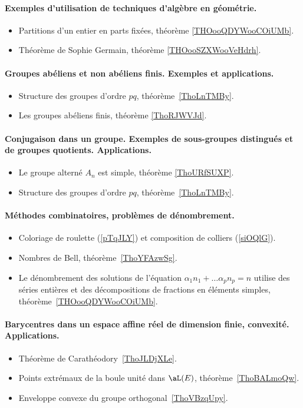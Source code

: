 \paragraph{Exemples d'utilisation de techniques d'algèbre en géométrie.}


\begin{itemize}
	\item Partitions d'un entier en parts fixées, théorème \ref{THOooQDYWooCOiUMb}.
	\item Théorème de Sophie Germain, théorème \ref{THOooSZXWooVeHdrh}.
\end{itemize}
\paragraph{Groupes abéliens et non abéliens finis. Exemples et applications.}
\begin{itemize}
	\item Structure des groupes d'ordre \( pq\), théorème~\ref{ThoLnTMBy}.
	\item Les groupes abéliens finis, théorème \ref{ThoRJWVJd}.
\end{itemize}
\paragraph{Conjugaison dans un groupe. Exemples  de  sous-groupes  distingués  et de groupes quotients. Applications.}
\begin{itemize}
	\item Le groupe alterné \( A_n\) est simple, théorème \ref{ThoURfSUXP}.
	\item Structure des groupes d'ordre \( pq\), théorème~\ref{ThoLnTMBy}.
\end{itemize}
\paragraph{Méthodes combinatoires, problèmes de dénombrement.}
\begin{itemize}
	\item Coloriage de roulette (\ref{pTqJLY}) et composition de colliers (\ref{siOQlG}).
	\item Nombres de Bell, théorème~\ref{ThoYFAzwSg}.
	\item Le dénombrement des solutions de l'équation \( \alpha_1 n_1+\ldots \alpha_pn_p=n\) utilise des séries entières et des décompositions de fractions en éléments simples, théorème~\ref{THOooQDYWooCOiUMb}.
\end{itemize}
\paragraph{Barycentres dans un espace affine réel de dimension finie, convexité. Applications.}
\begin{itemize}
	\item Théorème de Carathéodory~\ref{ThoJLDjXLe}.
	\item Points extrémaux de la boule unité dans \( \aL(E)\), théorème~\ref{ThoBALmoQw}.
	\item Enveloppe convexe du groupe orthogonal~\ref{ThoVBzqUpy}.
\end{itemize}
